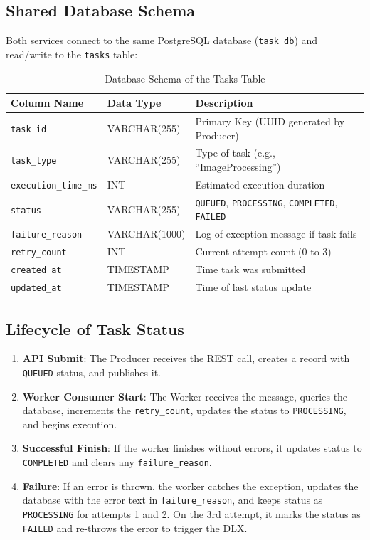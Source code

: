 \documentclass[11pt,a4paper]{article}
\begin{document}
\subsection{Shared Database Schema}
Both services connect to the same PostgreSQL database (\texttt{task\_db}) and read/write to the \texttt{tasks} table:

\begin{table}[h]
\centering
\begin{tabular}{lll}
\toprule
\textbf{Column Name} & \textbf{Data Type} & \textbf{Description} \\ \midrule
\texttt{task\_id} & VARCHAR(255) & Primary Key (UUID generated by Producer) \\
\texttt{task\_type} & VARCHAR(255) & Type of task (e.g., ``ImageProcessing'') \\
\texttt{execution\_time\_ms} & INT & Estimated execution duration \\
\texttt{status} & VARCHAR(255) & \texttt{QUEUED}, \texttt{PROCESSING}, \texttt{COMPLETED}, \texttt{FAILED} \\
\texttt{failure\_reason} & VARCHAR(1000) & Log of exception message if task fails \\
\texttt{retry\_count} & INT & Current attempt count (0 to 3) \\
\texttt{created\_at} & TIMESTAMP & Time task was submitted \\
\texttt{updated\_at} & TIMESTAMP & Time of last status update \\ \bottomrule
\end{tabular}
\caption{Database Schema of the Tasks Table}
\end{table}

\subsection{Lifecycle of Task Status}
\begin{enumerate}
    \item \textbf{API Submit}: The Producer receives the REST call, creates a record with \texttt{QUEUED} status, and publishes it.
    \item \textbf{Worker Consumer Start}: The Worker receives the message, queries the database, increments the \texttt{retry\_count}, updates the status to \texttt{PROCESSING}, and begins execution.
    \item \textbf{Successful Finish}: If the worker finishes without errors, it updates status to \texttt{COMPLETED} and clears any \texttt{failure\_reason}.
    \item \textbf{Failure}: If an error is thrown, the worker catches the exception, updates the database with the error text in \texttt{failure\_reason}, and keeps status as \texttt{PROCESSING} for attempts 1 and 2. On the 3rd attempt, it marks the status as \texttt{FAILED} and re-throws the error to trigger the DLX.
\end{enumerate}
\end{document}
